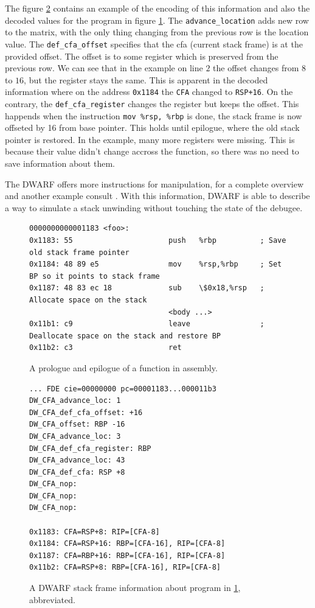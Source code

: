 The figure \ref{fig:dwarf-stack-frames} contains an example of the encoding of
this information and also the decoded values for the program in figure
\ref{fig:prologue-and-epilogue}. The \texttt{advance\_location} adds new row to
the matrix, with the only thing changing from the previous row is the location
value. The \texttt{def\_cfa\_offset} specifies that the cfa (current stack
frame) is at the provided offset. The offset is to some register which is
preserved from the previous row. We can see that in the example on line $2$ the
offset changes from $8$ to $16$, but the register stays the same. This is
apparent in the decoded information where on the address \texttt{0x1184} the
\texttt{CFA} changed to \texttt{RSP+16}. On the contrary, the
\texttt{def\_cfa\_register} changes the register but keeps the offset. This
happends when the instruction \texttt{mov \%rsp, \%rbp} is done, the stack
frame is now offseted by 16 from base pointer. This holds until epilogue, where
the old stack pointer is restored. In the example, many more registers were
missing. This is because their value didn't change accross the function, so
there was no need to save information about them.

The DWARF offers more instructions for manipulation, for a complete overview
and another example consult \cite{dwarf}. With this information, DWARF is able
to describe a way to simulate a stack unwinding without touching the state of
the debugee.

\begin{figure}
    \begin{lstlisting}
0000000000001183 <foo>:
0x1183:	55                   	push   %rbp          ; Save old stack frame pointer
0x1184:	48 89 e5             	mov    %rsp,%rbp     ; Set BP so it points to stack frame
0x1187:	48 83 ec 18          	sub    \$0x18,%rsp   ; Allocate space on the stack
                                <body ...>
0x11b1:	c9                   	leave                ; Deallocate space on the stack and restore BP
0x11b2:	c3                   	ret
    \end{lstlisting}
    \caption{A prologue and epilogue of a function in assembly.}
    \label{fig:prologue-and-epilogue}
\end{figure}

\begin{figure}
    \begin{lstlisting}
... FDE cie=00000000 pc=00001183...000011b3
DW_CFA_advance_loc: 1
DW_CFA_def_cfa_offset: +16
DW_CFA_offset: RBP -16
DW_CFA_advance_loc: 3
DW_CFA_def_cfa_register: RBP
DW_CFA_advance_loc: 43
DW_CFA_def_cfa: RSP +8
DW_CFA_nop:
DW_CFA_nop:
DW_CFA_nop:

0x1183: CFA=RSP+8: RIP=[CFA-8]
0x1184: CFA=RSP+16: RBP=[CFA-16], RIP=[CFA-8]
0x1187: CFA=RBP+16: RBP=[CFA-16], RIP=[CFA-8]
0x11b2: CFA=RSP+8: RBP=[CFA-16], RIP=[CFA-8]
    \end{lstlisting}
    \caption{A DWARF stack frame information about program in
             \ref{fig:prologue-and-epilogue}, abbreviated.}
    \label{fig:dwarf-stack-frames}
\end{figure}

